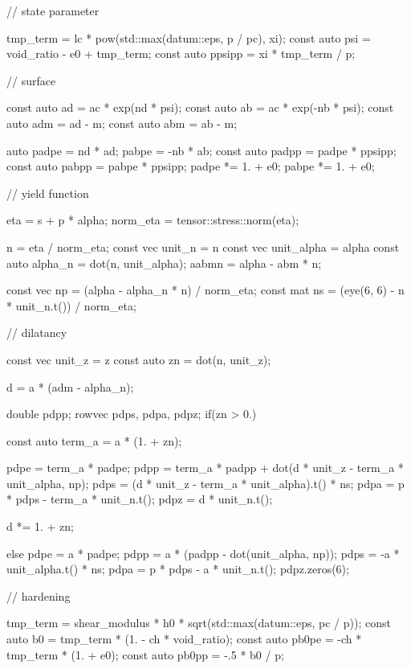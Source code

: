 \begin{cppcode}
{{        // state parameter

        tmp_term = lc * pow(std::max(datum::eps, p / pc), xi);
        const auto psi = void_ratio - e0 + tmp_term;
        const auto ppsipp = xi * tmp_term / p;

        // surface

        const auto ad = ac * exp(nd * psi);
        const auto ab = ac * exp(-nb * psi);
        const auto adm = ad - m;
        const auto abm = ab - m;

        auto padpe = nd * ad;
        pabpe = -nb * ab;
        const auto padpp = padpe * ppsipp;
        const auto pabpp = pabpe * ppsipp;
        padpe *= 1. + e0;
        pabpe *= 1. + e0;

        // yield function

        eta = s + p * alpha;
        norm_eta = tensor::stress::norm(eta);

        n = eta / norm_eta;
        const vec unit_n = n %
        const vec unit_alpha = alpha %
        const auto alpha_n = dot(n, unit_alpha);
        aabmn = alpha - abm * n;

        const vec np = (alpha - alpha_n * n) / norm_eta;
        const mat ns = (eye(6, 6) - n * unit_n.t()) / norm_eta;

        // dilatancy

        const vec unit_z = z %
        const auto zn = dot(n, unit_z);

        d = a * (adm - alpha_n);

        double pdpp;
        rowvec pdps, pdpa, pdpz;
        if(zn > 0.) {
            const auto term_a = a * (1. + zn);

            pdpe = term_a * padpe;
            pdpp = term_a * padpp + dot(d * unit_z - term_a * unit_alpha, np);
            pdps = (d * unit_z - term_a * unit_alpha).t() * ns;
            pdpa = p * pdps - term_a * unit_n.t();
            pdpz = d * unit_n.t();

            d *= 1. + zn;
        }
        else {
            pdpe = a * padpe;
            pdpp = a * (padpp - dot(unit_alpha, np));
            pdps = -a * unit_alpha.t() * ns;
            pdpa = p * pdps - a * unit_n.t();
            pdpz.zeros(6);
        }

        // hardening

        tmp_term = shear_modulus * h0 * sqrt(std::max(datum::eps, pc / p));
        const auto b0 = tmp_term * (1. - ch * void_ratio);
        const auto pb0pe = -ch * tmp_term * (1. + e0);
        const auto pb0pp = -.5 * b0 / p;

}}
\end{cppcode}
